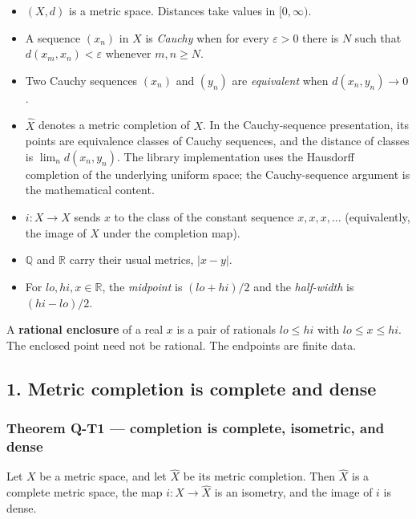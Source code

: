 \documentclass[
  11pt,
]{article}
\providecommand{\tightlist}{%
  \setlength{\itemsep}{0pt}\setlength{\parskip}{0pt}}
\begin{document}
\begin{itemize}
\tightlist
\item
  \((X,d)\) is a metric space. Distances take values in \([0,\infty)\).
\item
  A sequence \((x_n)\) in \(X\) is \emph{Cauchy} when for every \(\varepsilon>0\) there is \(N\) such that \(d(x_m,x_n)<\varepsilon\) whenever \(m,n\ge N\).
\item
  Two Cauchy sequences \((x_n)\) and \((y_n)\) are \emph{equivalent} when \(d(x_n,y_n)\to 0\).
\item
  \(\widehat{X}\) denotes a metric completion of \(X\). In the Cauchy-sequence presentation, its points are equivalence classes of Cauchy sequences, and the distance of classes is \(\lim_n d(x_n,y_n)\). The library implementation uses the Hausdorff completion of the underlying uniform space; the Cauchy-sequence argument is the mathematical content.
\item
  \(i:X\to\widehat{X}\) sends \(x\) to the class of the constant sequence \(x,x,x,\ldots\) (equivalently, the image of \(X\) under the completion map).
\item
  \(\mathbb{Q}\) and \(\mathbb{R}\) carry their usual metrics, \(|x-y|\).
\item
  For \(lo,hi,x\in\mathbb{R}\), the \emph{midpoint} is \((lo+hi)/2\) and the \emph{half-width} is \((hi-lo)/2\).
\end{itemize}

A \textbf{rational enclosure} of a real \(x\) is a pair of rationals \(lo\le hi\) with \(lo\le x\le hi\). The enclosed point need not be rational. The endpoints are finite data.

\subsection{1. Metric completion is complete and dense}\label{metric-completion-is-complete-and-dense}

\subsubsection{Theorem Q-T1 --- completion is complete, isometric, and dense}\label{theorem-q-t1-completion-is-complete-isometric-and-dense}

Let \(X\) be a metric space, and let \(\widehat{X}\) be its metric completion. Then \(\widehat{X}\) is a complete metric space, the map \(i:X\to\widehat{X}\) is an isometry, and the image of \(i\) is dense.
\end{document}

